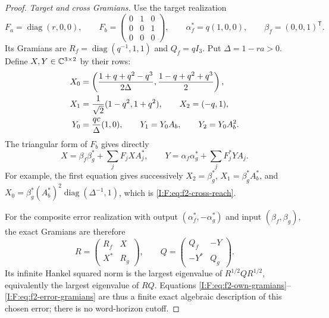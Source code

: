 \begin{proof}
\emph{Target and cross Gramians.}
Use the target realization
\[
 F_a=\operatorname{diag}(r,0,0),\qquad
 F_b=\begin{pmatrix}0&1&0\\0&0&1\\0&0&0\end{pmatrix},\qquad
 \alpha_f^*=q(1,0,0),\qquad \beta_f=(0,0,1)^{\mathsf T}.
\]
Its Gramians are
$R_f=\operatorname{diag}(q^{-1},1,1)$ and $Q_f=qI_3$.
Put $\Delta=1-ra>0$. Define $X,Y\in\mathbb C^{3\times2}$ by their rows:
\begin{align}
 X_0&=\left(\frac{1+q+q^2-q^3}{2\Delta},
                 \frac{1-q+q^2+q^3}{2}\right),\notag\\
 X_1&=\frac1{\sqrt2}(1-q^2,1+q^2),\qquad X_2=(-q,1),
 \label{I:F:eq:f2-cross-reach}\\
 Y_0&=\frac{qc}{\Delta}(1,0),\qquad
 Y_1=Y_0A_b,\qquad Y_2=Y_0A_b^2.
 \label{I:F:eq:f2-cross-observe}
\end{align}
The triangular form of $F_b$ gives directly
\[
 X=\beta_f\beta_g^*+\sum_jF_jXA_j^*,\qquad
 Y=\alpha_f\alpha_g^*+\sum_jF_j^*YA_j.
\]
For example, the first equation gives successively
$X_2=\beta_g^*$, $X_1=\beta_g^*A_b^*$, and
$X_0=\beta_g^*(A_b^*)^2\operatorname{diag}(\Delta^{-1},1)$,
which is \eqref{I:F:eq:f2-cross-reach}.

For the composite error realization with output
$(\alpha_f^*,-\alpha_g^*)$ and input $(\beta_f,\beta_g)$, the exact
Gramians are therefore
\begin{equation}
 R=\begin{pmatrix}R_f&X\\X^*&R_g\end{pmatrix},\qquad
 Q=\begin{pmatrix}Q_f&-Y\\-Y^*&Q_g\end{pmatrix}.
 \label{I:F:eq:f2-error-gramians}
\end{equation}
Its infinite Hankel squared norm is the largest eigenvalue of
$R^{1/2}QR^{1/2}$, equivalently the largest eigenvalue of $RQ$.
Equations \eqref{I:F:eq:f2-own-gramians}--\eqref{I:F:eq:f2-error-gramians}
are thus a finite exact algebraic description of this chosen error;
there is no word-horizon cutoff.


\end{proof}
